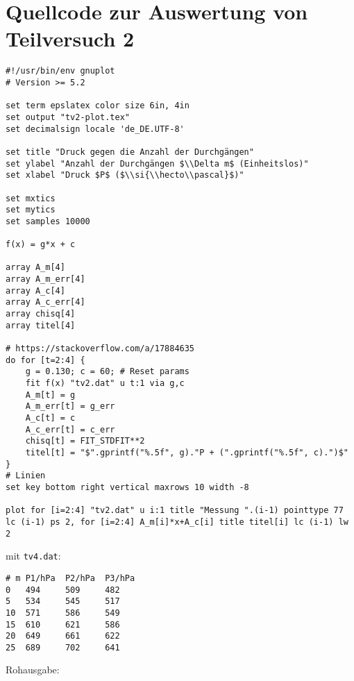 \section{\gnuplot{} Quellcode zur Auswertung von Teilversuch 2}
    \label{appdx:gnuplottv2}
    {  
        \renewcommand{\fcolorbox}[4][]{#4}
        \begin{verbatim}
#!/usr/bin/env gnuplot
# Version >= 5.2

set term epslatex color size 6in, 4in
set output "tv2-plot.tex"
set decimalsign locale 'de_DE.UTF-8'

set title "Druck gegen die Anzahl der Durchgängen"
set ylabel "Anzahl der Durchgängen $\\Delta m$ (Einheitslos)"
set xlabel "Druck $P$ ($\\si{\\hecto\\pascal}$)"

set mxtics
set mytics
set samples 10000

f(x) = g*x + c

array A_m[4]
array A_m_err[4]
array A_c[4]
array A_c_err[4]
array chisq[4]
array titel[4]

# https://stackoverflow.com/a/17884635
do for [t=2:4] {
    g = 0.130; c = 60; # Reset params
    fit f(x) "tv2.dat" u t:1 via g,c
    A_m[t] = g
    A_m_err[t] = g_err
    A_c[t] = c
    A_c_err[t] = c_err
    chisq[t] = FIT_STDFIT**2
    titel[t] = "$".gprintf("%.5f", g)."P + (".gprintf("%.5f", c).")$"
}
# Linien
set key bottom right vertical maxrows 10 width -8

plot for [i=2:4] "tv2.dat" u i:1 title "Messung ".(i-1) pointtype 77 lc (i-1) ps 2, for [i=2:4] A_m[i]*x+A_c[i] title titel[i] lc (i-1) lw 2
        \end{verbatim}
    }
    mit \texttt{tv4.dat}:
    \begin{multicols}{2}
        \begin{verbatim}
# m P1/hPa  P2/hPa  P3/hPa
0   494     509     482
5   534     545     517
10  571     586     549
15  610     621     586
20  649     661     622
25  689     702     641
        \end{verbatim}
    \end{multicols}
    \vspace{-\baselineskip}
    Rohausgabe:
